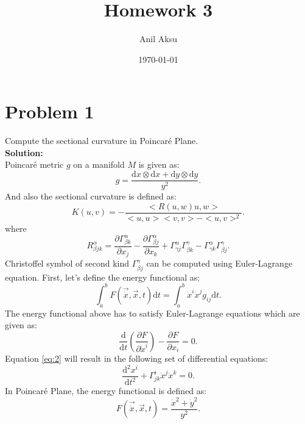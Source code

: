 \documentclass[11pt]{amsart}
\title{Homework 3}
\author{Anil Aksu}
\date{\today}
\begin{document}
\maketitle

\section*{Problem 1 }

Compute the sectional curvature in Poincar\'{e} Plane.
\\
\textbf{Solution:}\\
Poincar\'{e} metric $g$ on a manifold $M$ is given as:
\begin{equation}
g=\frac{\mathrm{d}x\otimes \mathrm{d}x +\mathrm{d}y\otimes \mathrm{d}y }{y^2}.
\end{equation} 
And also the sectional curvature is defined as:
\begin{equation}
K(u,v)=-\frac{<R(u,w)u,w>}{<u,u><v,v>-<u,v>^2}.
\end{equation} 
where
\begin{equation*}
R_{\beta jk}^{\alpha}=\frac{\partial \Gamma_{\beta k}^{\alpha}}{\partial x_j}-\frac{\partial \Gamma_{\beta j}^{\alpha}}{\partial x_k}+ \Gamma_{\gamma j}^{\alpha} \Gamma_{\beta k}^{\gamma}- \Gamma_{\gamma k}^{\alpha} \Gamma_{\beta j}^{\gamma}.
\end{equation*}
Christoffel  symbol of second kind $\Gamma_{\beta j}^{\gamma}$ can be computed using Euler-Lagrange equation. First, let's define the energy functional as:
\begin{equation}
\label{eq:1}
\int_{a}^{b}F(\vec{\dot{x}},\vec{x},t)\mathrm{d}t=\int_{a}^{b}\dot{x}^{i}\dot{x}^{j}g_{ij}\mathrm{d}t.
\end{equation}
The energy functional above has to satisfy Euler-Lagrange equations which are given as:
\begin{equation}
\label{eq:2}
\frac{\mathrm{d}}{\mathrm{d} t}(\frac{\partial F}{\partial \dot{x}^i})-\frac{\partial F}{\partial x_i}=0.
\end{equation}
Equation \ref{eq:2}  will result in the following set of differential equations:
\begin{equation}
\label{eq:3}
\frac{\mathrm{d}^2 x^i}{\mathrm{d} t^2}+\Gamma_{j k}^{i}\dot{x}^j \dot{x}^k =0.
\end{equation}
In Poincar\'{e} Plane, the energy functional is defined as:
\begin{equation}
\label{eq:4}
F(\vec{\dot{x}},\vec{x},t)=\frac{\dot{x}^2+\dot{y}^2}{y^2}.
\end{equation}
\end{document}

